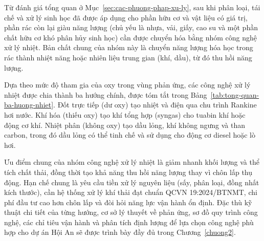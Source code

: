 \documentclass[../main.tex]{subfiles}
\begin{document}
Từ đánh giá tổng quan ở Mục~\ref{sec:cac-phuong-phap-xu-ly}, sau khi phân loại, tái chế và xử lý sinh học đã được áp dụng cho phần hữu cơ và vật liệu có giá trị, phần rác còn lại giàu năng lượng (chủ yếu là nhựa, vải, giấy, cao su và một phần chất hữu cơ khó phân hủy sinh học) cần được chuyển hóa bằng nhóm công nghệ xử lý nhiệt. Bản chất chung của nhóm này là chuyển năng lượng hóa học trong rác thành nhiệt năng hoặc nhiên liệu trung gian (khí, dầu), từ đó thu hồi năng lượng.

Dựa theo mức độ tham gia của oxy trong vùng phản ứng, các công nghệ xử lý nhiệt được chia thành ba hướng chính, được tóm tắt trong Bảng~\ref{tab:tong-quan-ba-huong-nhiet}. Đốt trực tiếp (dư oxy) tạo nhiệt và điện qua chu trình Rankine hơi nước. Khí hóa (thiếu oxy) tạo khí tổng hợp (syngas) cho tuabin khí hoặc động cơ khí. Nhiệt phân (không oxy) tạo dầu lỏng, khí không ngưng và than carbon, trong đó dầu lỏng có thể tinh chế và sử dụng cho động cơ diesel hoặc lò hơi.

\begin{table}[htbp]
\centering
\caption{Tổng quan ba hướng công nghệ xử lý nhiệt CTRSH}
\label{tab:tong-quan-ba-huong-nhiet}
\setlength{\tabcolsep}{5pt}
\end{table}

Ưu điểm chung của nhóm công nghệ xử lý nhiệt là giảm nhanh khối lượng và thể tích chất thải, đồng thời tạo khả năng thu hồi năng lượng thay vì chôn lấp thụ động. Hạn chế chung là yêu cầu tiền xử lý nguyên liệu (sấy, phân loại, đồng nhất kích thước), cần hệ thống xử lý khí thải đạt chuẩn QCVN 19:2024/BTNMT, chi phí đầu tư cao hơn chôn lấp và đòi hỏi năng lực vận hành ổn định. Đặc thù kỹ thuật chi tiết của từng hướng, cơ sở lý thuyết về phản ứng, sơ đồ quy trình công nghệ, các chỉ tiêu vận hành và phân tích định lượng để lựa chọn công nghệ phù hợp cho dự án Hội An sẽ được trình bày đầy đủ trong Chương~\ref{chuong2}.
\end{document}
